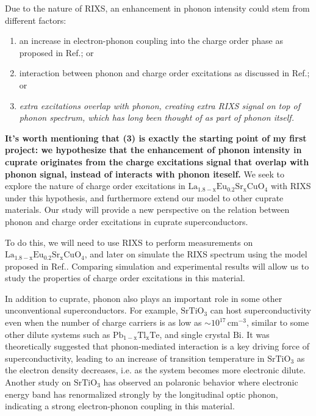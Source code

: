 \documentclass[11pt]{article}
\begin{document}
Due to the nature of RIXS, an enhancement in phonon intensity could stem from different factors: 
\begin{enumerate}
  \item an increase in electron-phonon coupling into the charge order phase as proposed in Ref.\cite{wang_charge_2021,peng_electronic_2022}; or
  \item interaction between phonon and charge order excitations as discussed in Ref.\cite{li_multiorbital_2020, chaix_dispersive_2017,huang_quantum_2021}; or 
  \item \textit{extra excitations overlap with phonon, creating extra RIXS signal on top of phonon spectrum, which has long been thought of as part of phonon itself.} 
\end{enumerate}
\textbf{It's worth mentioning that (3) is exactly the starting point of my first project: we hypothesize that the enhancement of phonon intensity in cuprate originates from the charge excitations signal that overlap with phonon signal, instead of interacts with phonon iteself.}  We seek to explore the nature of charge order excitations in $\mathrm{La_{1.8-x}Eu_{0.2}Sr_xCuO_{4}}$ with RIXS under this hypothesis, and furthermore extend our model to other cuprate materials. Our study will provide a new perspective on the relation between phonon and charge order excitations in cuprate superconductors. 

To do this, we will need to use RIXS to perform measurements on $\mathrm{La_{1.8-x}Eu_{0.2}Sr_xCuO_{4}}$, and later on simulate the RIXS spectrum using the model proposed in Ref.\cite{devereaux_directly_2016}. Comparing simulation and experimental results will allow us to study the properties of charge order excitations in this material. 

In addition to cuprate, phonon also plays an important role in some other unconventional superconductors. For example, $\mathrm{SrTiO_{3}}$ can host superconductivity even when the number of charge carriers is as low as $\sim 10^{17}\,\mathrm{cm^{-3}}$\cite{schooley_superconductivity_1964,lin_fermi_2013}, similar to some other dilute systems such as $\mathrm{Pb_{1-x}Tl_{x}Te}$\cite{}, and single crystal $\mathrm{Bi}$\cite{}. It was theoretically suggested that phonon-mediated interaction is a key driving force of superconductivity, leading to an increase of transition temperature in $\mathrm{SrTiO_{3}}$ as the electron density decreases\cite{gastiasoro_phonon-mediated_2019}, i.e. as the system becomes more electronic dilute. Another study on $\mathrm{SrTiO_{3}}$ has observed an polaronic behavior where electronic energy band has renormalized strongly by the longitudinal optic phonon, indicating a strong electron-phonon coupling in this material\cite{swartz_polaronic_2018}. 
\end{document}
